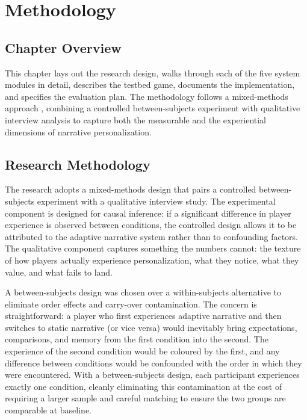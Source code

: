 \chapter{Methodology}

\section{Chapter Overview}

This chapter lays out the research design, walks through each of the five system modules in detail, describes the testbed game, documents the implementation, and specifies the evaluation plan. The methodology follows a mixed-methods approach \citep{creswell2017mixed}, combining a controlled between-subjects experiment with qualitative interview analysis to capture both the measurable and the experiential dimensions of narrative personalization.

\section{Research Methodology}

The research adopts a mixed-methods design that pairs a controlled between-subjects experiment with a qualitative interview study. The experimental component is designed for causal inference: if a significant difference in player experience is observed between conditions, the controlled design allows it to be attributed to the adaptive narrative system rather than to confounding factors. The qualitative component captures something the numbers cannot: the texture of how players actually experience personalization, what they notice, what they value, and what fails to land.

A between-subjects design was chosen over a within-subjects alternative to eliminate order effects and carry-over contamination. The concern is straightforward: a player who first experiences adaptive narrative and then switches to static narrative (or vice versa) would inevitably bring expectations, comparisons, and memory from the first condition into the second. The experience of the second condition would be coloured by the first, and any difference between conditions would be confounded with the order in which they were encountered. With a between-subjects design, each participant experiences exactly one condition, cleanly eliminating this contamination at the cost of requiring a larger sample and careful matching to ensure the two groups are comparable at baseline.

